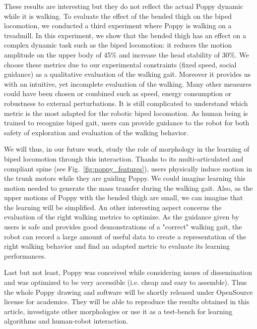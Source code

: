 These results are interesting but they do not reflect the actual Poppy dynamic while it is walking. To evaluate the effect of the bended thigh on the biped locomotion, we conducted a third experiment where Poppy is walking on a treadmill. In this experiment, we show that the bended thigh has an effect on a complex dynamic task such as the biped locomotion: it reduces the motion amplitude on the upper body of 45\% and increase the head stability of 30\%. We choose these metrics due to our experimental constraints (fixed speed, social guidance) as a qualitative evaluation of the walking gait. Moreover it provides us with an intuitive, yet incomplete evaluation of the walking. Many other measures could have been chosen or combined such as speed, energy consumption or robustness to external perturbations. It is still complicated to understand which metric is the most adapted for the robotic biped locomotion. As human being is trained to recognize biped gait, users can provide guidance to the robot for both safety of exploration and evaluation of the walking behavior.

We will thus, in our future work, study the role of morphology in the learning of biped locomotion through this interaction. Thanks to its multi-articulated and compliant spine (see Fig.~\ref{fig:poppy_features}), users physically induce motion in the trunk motors while they are guiding Poppy. We could imagine learning this motion needed to generate the mass transfer during the walking gait. Also, as the upper motions of Poppy with the bended thigh are small, we can imagine that the learning will be simplified. An other interesting aspect concerns the evaluation of the right walking metrics to optimize. As the guidance given by users is safe and provides good demonstrations of a "correct" walking gait, the robot can record a large amount of useful data to create a representation of the right walking behavior and find an adapted metric to evaluate its learning performances.

Last but not least, Poppy was conceived while considering issues of dissemination and was optimized to be very accessible (i.e. cheap and easy to assemble). Thus the whole Poppy drawing and software will be shortly released under OpenSource license for academics. They will be able to reproduce the results obtained in this article, investigate other morphologies or use it as a test-bench for learning algorithms and human-robot interaction.
